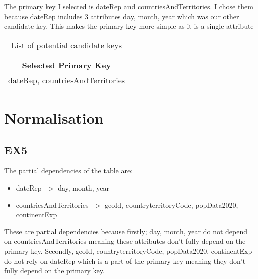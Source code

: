 \documentclass[]{article}
\begin{document}
The primary key I selected is dateRep and countriesAndTerritories. I chose them because
dateRep includes 3 attributes day, month, year which was our other candidate key. This makes the primary key
more simple as it is a single attribute

\begin{table}[h]
    \centering
    \begin{tabular}{ |c| }
            \hline
            \textbf{Selected Primary Key} \\
            \hline
                dateRep, countriesAndTerritories\\
            \hline
        \end{tabular}
        \caption{List of potential candidate keys}
        \end{table}

\section{Normalisation}

\subsection{EX5}
The partial dependencies of the table are:
\begin{itemize}
    \item dateRep -$>$  day, month, year
    \item countriesAndTerritories -$>$ geoId, countryterritoryCode, popData2020, continentExp
\end{itemize}
These are partial dependencies because firstly; day, month, year do not depend on countriesAndTerritories meaning these attributes don't fully depend
on the primary key. Secondly, geoId, countryterritoryCode, popData2020, continentExp do not rely on dateRep which is a part of the primary key meaning
they don't fully depend on the primary key.
\end{document}
